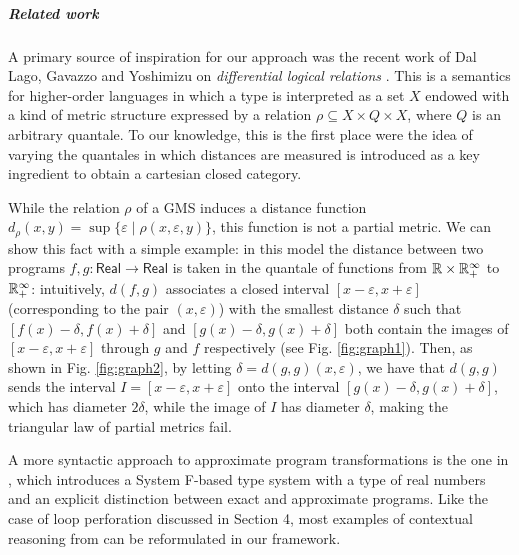 \subparagraph*{Related work}


A primary source of inspiration for our approach was the recent work of Dal Lago, Gavazzo and Yoshimizu on  \emph{differential logical relations} \cite{dallago:differential-stlc}. This is a semantics for higher-order languages in which a type is interpreted as a set $X$ endowed with a kind of metric structure expressed by a relation $\rho \subseteq X\times Q\times X$, where $Q$ is an arbitrary quantale. To our knowledge, this is the first place were the idea of varying the quantales in which distances are measured is introduced as a key ingredient to obtain a cartesian closed category.

While the relation $\rho$ of a GMS induces a distance function $d_{\rho}(x,y)=\sup\{\varepsilon\mid \rho(x,\varepsilon,y)\}$, this function is not a partial metric. We can show this fact with a simple example: in this model the distance between two programs 
 $f,g:\mathsf{Real}\to \mathsf{Real}$ is taken in the quantale of functions from $\mathbb{R}\times \mathbb{R}_{+}^{\infty}$ to $\mathbb{R}_{+}^{\infty}$: intuitively, 
  $d(f,g)$ associates a closed interval $[x-\varepsilon,x+\varepsilon]$ (corresponding to the pair $(x,\varepsilon)$) with the smallest distance $\delta$ such that $[ f(x)-\delta, f(x)+\delta]$ and $[g(x)-\delta,g(x)+\delta]$ both contain the images of $[x-\varepsilon, x+\varepsilon]$ through
 $g$ and $f$ respectively (see Fig. \ref{fig:graph1}). Then, as shown in Fig. \ref{fig:graph2}, by letting $\delta=d(g,g)(x,\varepsilon)$, we have that $d(g,g)$ sends the interval $I=[x-\varepsilon, x+\varepsilon]$ onto the interval $[g(x)-\delta, g(x)+\delta]$, which has diameter $2\delta$, while the image of $I$ has diameter $\delta$, making the triangular law of partial metrics fail. 



A more syntactic approach to approximate program transformations is the one in 
\cite{chaudhuri}, which introduces a System F-based type system with a type of real numbers and an explicit distinction between exact and approximate programs.
Like the case of loop perforation discussed in Section 4, most examples of contextual reasoning from \cite{chaudhuri} can be  reformulated in our framework. 





